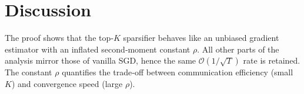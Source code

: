 \documentclass{article}
\begin{document}
\section*{Discussion}
The proof shows that the top‑$K$ sparsifier behaves like an unbiased
gradient estimator with an inflated second‑moment constant $\rho$.
All other parts of the analysis mirror those of vanilla SGD,
hence the same $\mathcal{O}(1/\sqrt{T})$ rate is retained.
The constant $\rho$ quantifies the trade‑off between communication
efficiency (small $K$) and convergence speed (large $\rho$).
\end{document}
